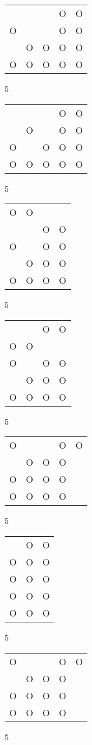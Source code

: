 \begin{tabular}{|m{0.2cm}m{0.2cm}m{0.2cm}m{0.2cm}m{0.2cm}|}\hline
 & & &O&O\\
O& & &O&O\\
 &O&O&O&O\\
O&O&O&O&O\\
\hline\end{tabular}5
\begin{tabular}{|m{0.2cm}m{0.2cm}m{0.2cm}m{0.2cm}m{0.2cm}|}\hline
 & & &O&O\\
 &O& &O&O\\
O& &O&O&O\\
O&O&O&O&O\\
\hline\end{tabular}5
\begin{tabular}{|m{0.2cm}m{0.2cm}m{0.2cm}m{0.2cm}|}\hline
O&O& & \\
 & &O&O\\
O& &O&O\\
 &O&O&O\\
O&O&O&O\\
\hline\end{tabular}5
\begin{tabular}{|m{0.2cm}m{0.2cm}m{0.2cm}m{0.2cm}|}\hline
 & &O&O\\
O&O& & \\
O& &O&O\\
 &O&O&O\\
O&O&O&O\\
\hline\end{tabular}5
\begin{tabular}{|m{0.2cm}m{0.2cm}m{0.2cm}m{0.2cm}m{0.2cm}|}\hline
O& & &O&O\\
 &O&O&O& \\
O&O&O&O& \\
O&O&O&O& \\
\hline\end{tabular}5
\begin{tabular}{|m{0.2cm}m{0.2cm}m{0.2cm}|}\hline
 &O&O\\
O&O&O\\
O&O&O\\
O&O&O\\
O&O&O\\
\hline\end{tabular}5
\begin{tabular}{|m{0.2cm}m{0.2cm}m{0.2cm}m{0.2cm}m{0.2cm}|}\hline
O& & &O&O\\
 &O&O&O& \\
O&O&O&O& \\
O&O&O&O& \\
\hline\end{tabular}5

